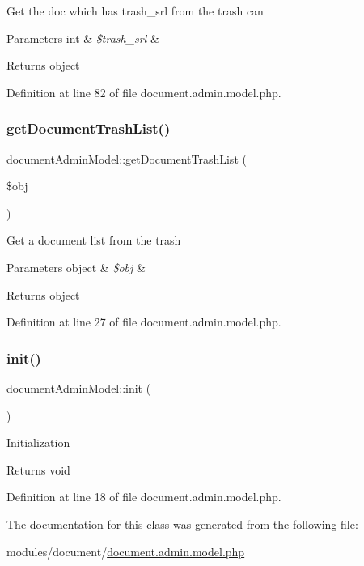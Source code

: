 Get the doc which has trash\+\_\+srl from the trash can 
\begin{DoxyParams}[1]{Parameters}
int & {\em \$trash\+\_\+srl} & \\
\hline
\end{DoxyParams}
\begin{DoxyReturn}{Returns}
object 
\end{DoxyReturn}


Definition at line 82 of file document.\+admin.\+model.\+php.

\mbox{\label{classdocumentAdminModel_a2dde1d3304ebc18a52a841aee71b4fad}} 
\subsubsection{\texorpdfstring{get\+Document\+Trash\+List()}{getDocumentTrashList()}}
{\footnotesize\ttfamily document\+Admin\+Model\+::get\+Document\+Trash\+List (\begin{DoxyParamCaption}\item[{}]{\$obj }\end{DoxyParamCaption})}

Get a document list from the trash 
\begin{DoxyParams}[1]{Parameters}
object & {\em \$obj} & \\
\hline
\end{DoxyParams}
\begin{DoxyReturn}{Returns}
object 
\end{DoxyReturn}


Definition at line 27 of file document.\+admin.\+model.\+php.

\mbox{\label{classdocumentAdminModel_aa2d2c19a8a236499b03c085bbf578c11}} 
\subsubsection{\texorpdfstring{init()}{init()}}
{\footnotesize\ttfamily document\+Admin\+Model\+::init (\begin{DoxyParamCaption}{ }\end{DoxyParamCaption})}

Initialization \begin{DoxyReturn}{Returns}
void 
\end{DoxyReturn}


Definition at line 18 of file document.\+admin.\+model.\+php.



The documentation for this class was generated from the following file\+:\begin{DoxyCompactItemize}
\item 
modules/document/\hyperlink{document_8admin_8model_8php}{document.\+admin.\+model.\+php}\end{DoxyCompactItemize}
